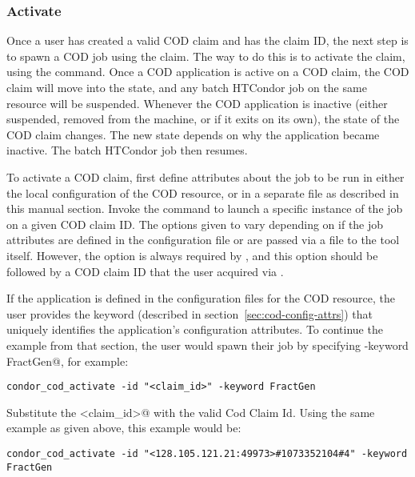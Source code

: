 \subsubsection{\label{sec:cod-claim-activate}Activate}

Once a user has created a valid COD claim and has the claim ID, the
next step is to spawn a COD job using the claim.
The way to do this is to activate the claim, using the
 command.
Once a COD application is active on a COD claim, the COD claim will
move into the \verb@Running@ state, and any batch HTCondor job
on the same resource will be suspended.
Whenever the COD application is inactive (either suspended, removed
from the machine, or if it exits on its own), the state of the COD
claim changes. The new state depends on why the application
became inactive. 
The batch HTCondor job then resumes.

To activate a COD claim, first define attributes about
the job to be run in either the local configuration of the COD
resource, or in a separate file as described in this manual section.
Invoke the
 command to launch a specific instance of the
job on a given COD claim ID.
The options given to  vary depending on if the
job attributes are defined in the configuration file or are
passed via a file to the  tool itself.
However, the  option is always required by
, and this option should be followed
by a COD claim ID that
the user acquired via .


If the application is defined in the configuration files for the COD
resource, the user provides the keyword (described in
section~\ref{sec:cod-config-attrs}) that uniquely identifies the
application's configuration attributes.
To continue the example from that section, the user would spawn their
job by specifying \verb@-keyword FractGen@, for example:
\begin{verbatim}
condor_cod_activate -id "<claim_id>" -keyword FractGen
\end{verbatim}
Substitute the \verb@<claim_id>@ with the valid Cod Claim Id.
Using the same example as given above, this example would be:
\footnotesize
\begin{verbatim}
condor_cod_activate -id "<128.105.121.21:49973>#1073352104#4" -keyword FractGen
\end{verbatim}
\normalsize

